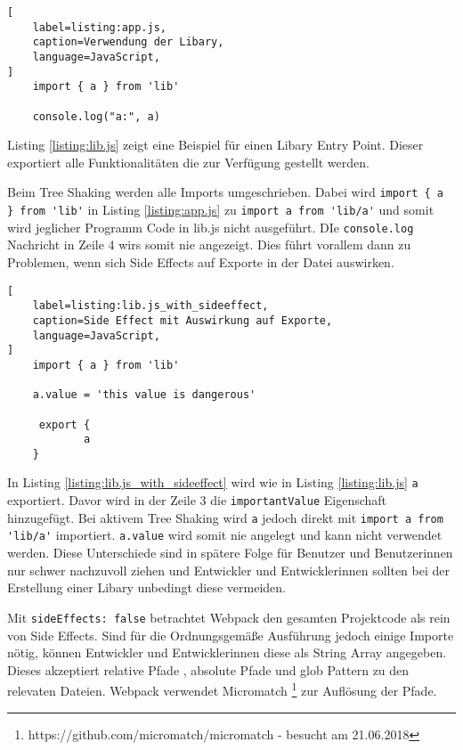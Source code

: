 \begin{lstlisting}[
    label=listing:app.js,
	caption=Verwendung der Libary,
	language=JavaScript,
]
	import { a } from 'lib'
    
    console.log("a:", a)
\end{lstlisting}

Listing \ref{listing:lib.js} zeigt eine Beispiel für einen Libary Entry Point. Dieser exportiert alle Funktionalitäten die zur Verfügung gestellt werden.

Beim Tree Shaking werden alle Imports umgeschrieben. Dabei wird \lstinline|import { a } from 'lib'| in Listing \ref{listing:app.js} zu \lstinline{import a from 'lib/a'} und somit wird jeglicher Programm Code in lib.js nicht ausgeführt. DIe \lstinline{console.log} Nachricht in Zeile 4 wirs somit nie angezeigt. Dies führt vorallem dann zu Problemen, wenn sich Side Effects auf Exporte in der Datei auswirken. 

\begin{lstlisting}[
    label=listing:lib.js_with_sideeffect,
	caption=Side Effect mit Auswirkung auf Exporte,
	language=JavaScript,
]
	import { a } from 'lib'
    
	a.value = 'this value is dangerous'    
    
     export {
    		a
    }
\end{lstlisting}

In Listing \ref{listing:lib.js_with_sideeffect} wird wie in Listing \ref{listing:lib.js} \lstinline{a} exportiert. Davor wird in der Zeile 3 die \lstinline{importantValue} Eigenschaft hinzugefügt. Bei aktivem Tree Shaking wird \lstinline{a} jedoch direkt mit \lstinline{import a from 'lib/a'} importiert. \lstinline{a.value} wird somit nie angelegt und kann nicht verwendet werden. Diese Unterschiede sind in spätere Folge für Benutzer und Benutzerinnen nur schwer nachzuvoll ziehen und Entwickler und Entwicklerinnen sollten bei der Erstellung einer Libary unbedingt diese vermeiden.\autocite{WebpackTreeShaking}

Mit \lstinline{sideEffects: false} betrachtet Webpack den gesamten Projektcode als rein von Side Effects. Sind für die Ordnungsgemäße Ausführung jedoch einige Importe nötig, können Entwickler und Entwicklerinnen diese als String Array angegeben. Dieses akzeptiert relative Pfade , absolute Pfade und glob Pattern zu den relevaten Dateien. Webpack verwendet Micromatch \footnote{https://github.com/micromatch/micromatch - besucht am 21.06.2018} zur Auflösung der Pfade.\autocite{WebpackTreeShaking}

